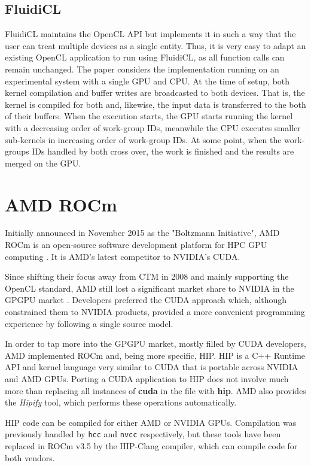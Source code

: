 \subsection{FluidiCL}
FluidiCL \cite{fluidicl} maintains the OpenCL API but implements it in such a way that the user can treat multiple devices as a single entity. Thus, it is very easy to adapt an existing OpenCL application to run using FluidiCL, as all function calls can remain unchanged. The paper considers the implementation running on an experimental system with a single GPU and CPU. At the time of setup, both kernel compilation and buffer writes are broadcasted to both devices. That is, the kernel is compiled for both and, likewise, the input data is transferred to the both of their buffers. When the execution starts, the GPU starts running the kernel with a decreasing order of work-group IDs, meanwhile the CPU executes smaller sub-kernels in increasing order of work-group IDs. At some point, when the work-groups IDs handled by both cross over, the work is finished and the results are merged on the GPU.

\section{AMD ROCm}
Initially announced in November 2015 as the "Boltzmann Initiative", AMD ROCm is an open-source software development platform for HPC GPU computing \cite{boltzmann_initiative}. It is AMD's latest competitor to NVIDIA's CUDA.

Since shifting their focus away from CTM in 2008 and mainly supporting the OpenCL standard, AMD still lost a significant market share to NVIDIA in the GPGPU market \cite{amd_as_alternative}. Developers preferred the CUDA approach which, although constrained them to NVIDIA products, provided a more convenient programming experience by following a single source model.

In order to tap more into the GPGPU market, mostly filled by CUDA developers, AMD implemented ROCm and, being more specific, HIP. HIP is a C++ Runtime API and kernel language very similar to CUDA that is portable across NVIDIA and AMD GPUs. Porting a CUDA application to HIP does not involve much more than replacing all instances of \textbf{cuda} in the file with \textbf{hip}. AMD also provides the \textit{Hipify} tool, which performs these operations automatically.

HIP code can be compiled for either AMD or NVIDIA GPUs. Compilation was previously handled by \texttt{hcc} and \texttt{nvcc} respectively, but these tools have been replaced in ROCm v3.5 by the HIP-Clang compiler, which can compile code for both vendors.

